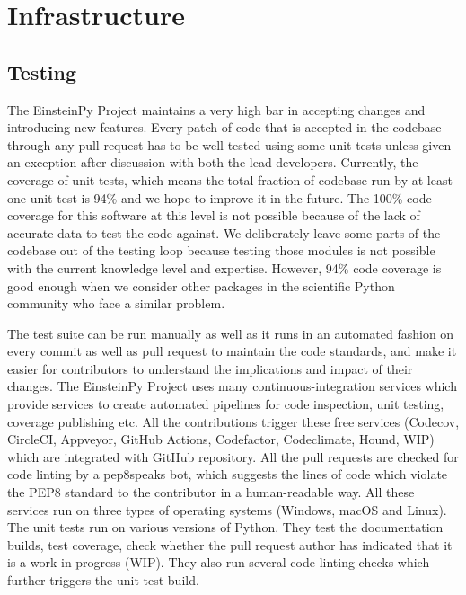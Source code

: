 \documentclass[onecolumn]{aa}
\begin{document}
\section{Infrastructure} \label{sec:infra}
\subsection{Testing} \label{subsec:testing}
The EinsteinPy Project maintains a very high bar in accepting changes and introducing new features. Every patch of code that is accepted in the codebase through any pull request has to be well tested using some unit tests unless given an exception after discussion with both the lead developers. Currently, the coverage of unit tests, which means the total fraction of codebase run by at least one unit test is 94\% and we hope to improve it in the future. The 100\% code coverage for this software at this level is not possible because of the lack of accurate data to test the code against. We deliberately leave some parts of the codebase out of the testing loop because testing those modules is not possible with the current knowledge level and expertise. However, 94\% code coverage is good enough when we consider other packages in the scientific Python community who face a similar problem.  

The test suite can be run manually as well as it runs in an automated fashion on every commit as well as pull request to maintain the code standards, and make it easier for contributors to understand the implications and impact of their changes. The EinsteinPy Project uses many continuous-integration services which provide services to create automated pipelines for code inspection, unit testing, coverage publishing etc. All the contributions trigger these free services (Codecov, CircleCI, Appveyor, GitHub Actions, Codefactor, Codeclimate, Hound, WIP) which are integrated with GitHub repository. All the pull requests are checked for code linting by a pep8speaks bot, which suggests the lines of code which violate the PEP8 standard to the contributor in a human-readable way. All these services run on three types of operating systems (Windows, macOS and Linux). The unit tests run on various versions of Python. They test the documentation builds, test coverage, check whether the pull request author has indicated that it is a work in progress (WIP). They also run several code linting checks which further triggers the unit test build.
\end{document}
